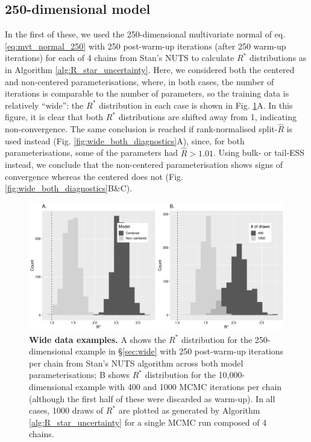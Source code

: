 \documentclass{article}
\begin{document}
\subsection{250-dimensional model}
In the first of these, we used the 250-dimensional multivariate normal of eq. \eqref{eq:mvt_normal_250} with 250 post-warm-up iterations (after 250 warm-up iterations) for each of 4 chains from Stan's NUTS to calculate $R^*$ distributions as in Algorithm \ref{alg:R_star_uncertainty}. Here, we considered both the centered and non-centered parameterisations, where, in both cases, the number of iterations is comparable to the number of parameters, so the training data is relatively ``wide'': the $R^*$ distribution in each case is shown in Fig. \ref{fig:mvt_wide_both}A. In this figure, it is clear that both $R^*$ distributions are shifted away from 1, indicating non-convergence. The same conclusion is reached if rank-normalised split-$\widehat{R}$ is used instead (Fig. \ref{fig:wide_both_diagnostics}A), since, for both parameterisations, some of the parameters had $\widehat{R}>1.01$. Using bulk- or tail-ESS instead, we conclude that the non-centered parameterisation shows signs of convergence whereas the centered does not (Fig. \ref{fig:wide_both_diagnostics}B\&C). 

\begin{figure}[!htb]
	\centerline{\includegraphics[width=1\textwidth]{../output/mvt_wide_both.pdf}}
	\caption{\textbf{Wide data examples.} A shows the $R^*$ distribution for the 250-dimensional example in \S\ref{sec:wide} with 250 post-warm-up iterations per chain from Stan's NUTS algorithm across both model parameterisations; B shows $R^*$ distribution for the 10,000-dimensional example with 400 and 1000 MCMC iterations per chain (although the first half of these were discarded as warm-up). In all cases, 1000 draws of $R^*$ are plotted as generated by Algorithm \ref{alg:R_star_uncertainty} for a single MCMC run composed of 4 chains.}
	\label{fig:mvt_wide_both}
\end{figure}
\end{document}

